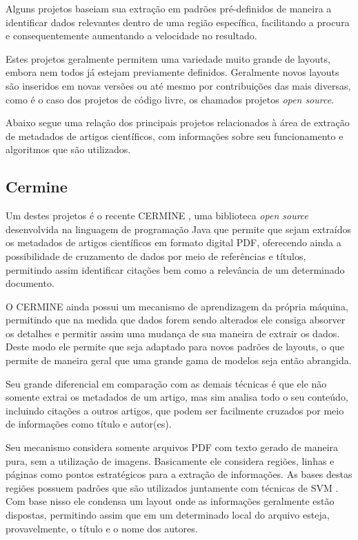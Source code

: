 Alguns projetos baseiam sua extração em padrões pré-definidos de maneira a identificar dados relevantes dentro de uma região específica, facilitando a procura e consequentemente aumentando a velocidade no resultado. 

Estes projetos geralmente permitem uma variedade muito grande de layouts, embora nem todos já estejam previamente definidos. Geralmente novos layouts são inseridos em novas versões ou até mesmo por contribuições das mais diversas, como é o caso dos projetos de código livre, os chamados projetos \textit{open source}.

Abaixo segue uma relação dos principais projetos relacionados à área de extração de metadados de artigos científicos, com informações sobre seu funcionamento e algoritmos que são utilizados.

\subsection{Cermine}


Um destes projetos é o recente CERMINE \cite{cermine}, uma biblioteca \textit{open source} desenvolvida na linguagem de programação Java que permite que sejam extraídos os metadados de artigos científicos em formato digital PDF, oferecendo ainda a possibilidade de cruzamento de dados por meio de referências e títulos, permitindo assim identificar citações bem como a relevância de um determinado documento.

O CERMINE ainda possui um mecanismo de aprendizagem da própria máquina, permitindo que na medida que dados forem sendo alterados ele consiga absorver os detalhes e permitir assim uma mudança de sua maneira de extrair os dados. Deste modo ele permite que seja adaptado para novos padrões de layouts, o que permite de maneira geral que uma grande gama de modelos seja então abrangida. 

Seu grande diferencial em comparação com as demais técnicas é que ele não somente extrai os metadados de um artigo, mas sim analisa todo o seu conteúdo, incluindo citações a outros artigos, que podem ser facilmente cruzados por meio de informações como título e autor(es).

Seu mecanismo considera somente arquivos PDF com texto gerado de maneira pura, sem a utilização de imagens. Basicamente ele considera regiões, linhas e páginas como pontos estratégicos para a extração de informações. As bases destas regiões possuem padrões que são utilizados juntamente com técnicas de SVM \cite{svm}. Com base nisso ele condensa um layout onde as informações geralmente estão dispostas, permitindo assim que em um determinado local do arquivo esteja, provavelmente, o título e o nome dos autores. 

